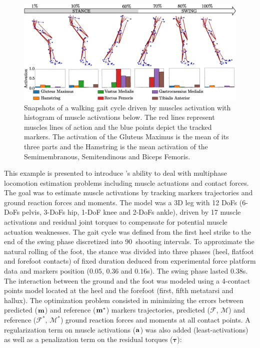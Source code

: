 \begin{figure}[t!]
\centering
\includegraphics[width=\textwidth]{figures/multiphase_walking_cycle.eps}
\caption{Snapshots of a walking gait cycle driven by muscles activation with histogram of muscle activations below. The red lines represent muscles lines of action and the blue points depict the tracked markers. The activation of the Gluteus Maximus is the mean of its three parts and the Hamstring is the mean activation of the Semimembranous, Semitendinous and Biceps Femoris. }
\label{fig:snapshots_multiphase_walking_cycle}
\end{figure}
This example is presented to introduce \bioptim's ability to deal with multiphase locomotion estimation problems including muscle actuations and contact forces.
The goal was to estimate muscle activations by tracking markers trajectories and ground reaction forces and moments. 
The model was a 3D leg with 12 DoFs (6-DoFs pelvis, 3-DoFs hip, 1-DoF knee and 2-DoFs ankle), driven by 17 muscle activations and residual joint torques to compensate for potential muscle actuation weaknesses. 
The gait cycle was defined from the first heel strike to the end of the swing phase discretized into 90~shooting intervals. 
To approximate the natural rolling of the foot, the stance was divided into three phases (heel, flatfoot and forefoot contacts) of fixed duration deduced from experimental force platform data and markers position ($0.05$, $0.36$ and $0.16$\:s).
The swing phase lasted $0.38$\:s. 
The interaction between the ground and the foot was modeled using a 4-contact points model located at the heel and the forefoot (first, fifth metatarsi and hallux).
The optimization problem consisted in minimizing the errors between predicted ($\bf{m}$) and reference ($\bf{m}^*$) markers trajectories, predicted ($\bm{\mathcal{F}}$, $\bm{\mathcal{M}}$) and reference ($\bm{\mathcal{F}^*}$, $\bm{\mathcal{M}}^*$) ground reaction forces and moments at all contact points.
A regularization term on muscle activations ($\bf{a}$) was also added (least-activations) as well as a penalization term on the residual torques ($\boldsymbol{\tau}$):

